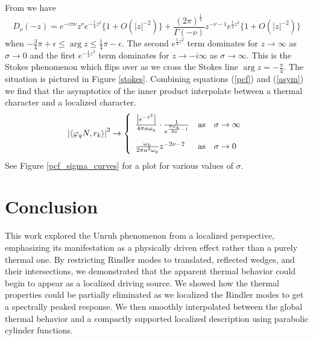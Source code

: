 \documentclass[12pt,a4paper]{article}
\begin{document}
From \cite{Olver1959UniformAE} we have
\begin{equation}
  D_\nu(-z) = e^{-i\pi\nu}z^{\nu}e^{-\frac{1}{4}z^2} \{ 1 + O(|z|^{-2}) \} + \frac{(2 \pi)^{\frac{1}{2}}}{\Gamma(-\nu)} z^{-\nu - 1} e^{\frac{1}{4}z^2} \{1 + O(|z|^{-2})\}
\label{asym}
\end{equation}
when $-\frac{3}{4}\pi + \epsilon \le \arg z \le \frac{1}{4} \pi - \epsilon$.  The second $e^{\frac{1}{4}z^2}$ term dominates for $z \to \infty$ as $\sigma \to 0$ and the first  $e^{-\frac{1}{4}z^2}$ term dominates for $z \to -i \infty$ as $\sigma \to \infty$.  This is the Stokes phenomenon which flips over as we cross the Stokes line $\arg z = -\frac{\pi}{4}$. The situation is pictured in Figure \ref{stokes}. Combining equations (\ref{pcf}) and (\ref{asym}) we find that the asymptotics of the inner product interpolate between a thermal character and a localized character.
\begin{equation}
  \left|\left< \varphi_q N, r_k \right>\right|^2 \rightarrow \left\{ \begin{array}{lll}
    \frac{\left| e^{-z^2} \right|}{4\pi a\omega_q} \cdot \frac{1}{e^{\frac{\pi \omega_k}{2a} - 1}}    & \text{as} & \sigma \to \infty     \vspace{10pt}
\\
    \frac{\omega_k}{2\pi a^2\omega_q} z^{-2\nu - 2} & \text{as} & \sigma \to 0 \\
  \end{array}  \right.  
\end{equation}
See Figure \ref{pcf_sigma_curves} for a plot for various values of $\sigma$.


\section{Conclusion}

This work explored the Unruh phenomenon from a localized perspective, emphasizing its manifestation as a physically driven effect rather than a purely thermal one. By restricting Rindler modes to translated, reflected wedges, and their intersections, we demonstrated that the apparent thermal behavior could begin to appear as a localized driving source. We showed how the thermal properties could be partially eliminated as we localized the Rindler modes to get a spectrally peaked response. We then smoothly interpolated between the global thermal behavior and a compactly supported localized description using parabolic cylinder functions.
\end{document}
